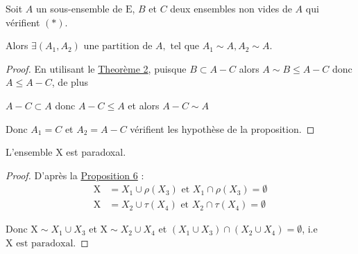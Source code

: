 \begin{prop}\label{prop12}
  \hfill

  Soit $A$ un sous-ensemble de $\mathrm{E}$, $B$ et $C$ deux ensembles non vides de $A$ qui vérifient $(*)$.\par
   Alors $\exists (A_1, A_2) \text{ une partition de } A, \text{ tel que } A_1 \sim A, A_2 \sim A$.
\end{prop}
\begin{proof}
  \hfill

    En utilisant le \hyperref[theorem1]{Theorème 2}, puisque $B \subset A-C$ alors $A \sim B \le A-C$ donc $A\le A-C$, de plus\par $A-C \subset A$ donc $A-C \le A$ et alors $A-C \sim A$\par
    Donc $A_1=C$ et $A_2=A-C$ vérifient les hypothèse de la proposition.\par
\end{proof}
\begin{lemma}\label{lemme19}
  L'ensemble $\mathrm{X}$ est paradoxal.
\end{lemma}
\begin{proof}
  \hfill

  D'après la \hyperref[prop7]{Proposition 6} :
  \begin{align*}
    \mathrm{X} &= X_1\cup \rho(X_3) \text{ et } X_1 \cap \rho(X_3) = \emptyset \\
    \mathrm{X} &= X_2\cup \tau(X_4) \text{ et } X_2 \cap \tau(X_4) = \emptyset
  \end{align*}\par
  Donc $\mathrm{X} \sim X_1 \cup X_3$ et $\mathrm{X} \sim X_2 \cup X_4$ et $(X_1 \cup X_3)\cap (X_2\cup X_4)=\emptyset$, i.e $\mathrm{X} \text{ est paradoxal}$.\par
\end{proof}

